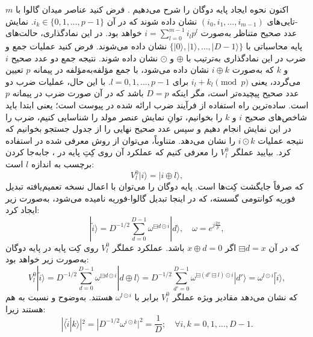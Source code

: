 اکنون نحوه ایجاد پایه دوگان را شرح می‌دهیم \cite{8-78, 8-84}. فرض کنید عناصر میدان گالوا با $m$-تایی‌های $(i_0, i_1, \dots, i_{m-1})$ نشان داده شوند که در آن $i_k \in \{0, 1, \dots, p-1\}$. نمایش عدد صحیح متناظر به‌صورت $i = \sum_{l=0}^{m-1} i_l p^l$ خواهد بود. در این نمادگذاری، حالت‌های پایه محاسباتی با $\{|0\rangle, |1\rangle, \dots, |D-1\rangle\}$ نشان داده می‌شوند. فرض کنید عملیات جمع و ضرب در این نمادگذاری به‌ترتیب با $\oplus$ و $\odot$ نشان داده شوند. نتیجه جمع دو عدد صحیح $i$ و $k$ که به‌صورت $i \oplus k$ نشان داده می‌شود، با جمع مؤلفه‌به‌مؤلفه در پیمانه $p$ تعیین می‌گردد، یعنی $i_l + k_l \pmod p$ برای $l = 0, 1, \dots, p-1$. با این حال، عملیات ضرب دو عدد صحیح پیچیده‌تر است، مگر اینکه $D = p$ باشد که در آن صورت ضرب در پیمانه $p$ است. ساده‌ترین راه استفاده از فرآیند ضرب ارائه شده در پیوست است؛ یعنی ابتدا باید شاخص‌های صحیح $i$ و $k$ را بخوانیم، توانِ نمایش عنصر مولد را شناسایی کنیم، ضرب را در این نمایش انجام دهیم و سپس عدد صحیح نهایی را از جدول جستجو بخوانیم که نتیجه عملیات $i \odot k$ را نشان می‌دهد. متناوباً، می‌توان از روش معرفی شده در \cite{8-78} استفاده کرد. بیایید عملگر $V_l^0$ را معرفی کنیم که عملکرد آن روی کِتِ پایه در ، جابه‌جا کردن برچسب به اندازه $l$ است:
\begin{equation}
	V_l^0 |i\rangle = |i \oplus l\rangle,
	\label{eq:8-82}
\end{equation}
که صرفاً جایگشت کِت‌ها است. پایه دوگان را می‌توان با اعمال نسخه تعمیم‌یافته تبدیل فوریه کوانتومی گسسته، که در اینجا تبدیل گالوا-فوریه نامیده می‌شود، به‌صورت زیر ایجاد کرد:
\begin{equation}
	|\tilde{i}\rangle = D^{-1/2} \sum_{d=0}^{D-1} \omega^{\boxminus d \odot i} |d\rangle, \quad \omega = e^{j\frac{2\pi}{p}},
	\label{eq:8-83}
\end{equation}
که در آن $\boxminus d = x$ اگر $x \oplus d = 0$ باشد. عملکرد عملگر $V_l^0$ روی کِت پایه در پایه دوگان به‌صورت زیر خواهد بود:
\begin{equation}
	V_l^0 |\tilde{i}\rangle = D^{-1/2} \sum_{d=0}^{D-1} \omega^{\boxminus d \odot i} |d \oplus l\rangle = D^{-1/2} \sum_{d'=0}^{D-1} \omega^{\boxminus(d' \boxminus l) \odot i} |d'\rangle = \omega^{l \odot i} |\tilde{i}\rangle,
	\label{eq:8-84}
\end{equation}
که نشان می‌دهد مقادیر ویژه عملگر $V_l^0$ برابر با $\omega^{l \odot i}$ هستند. به‌وضوح  و  نسبت به هم  هستند زیرا:
\begin{equation}
	|\langle \tilde{i} | k \rangle|^2 = |D^{-1/2} \omega^{i \odot k}|^2 = \frac{1}{D}; \quad \forall i, k = 0, 1, \dots, D-1.
	\label{eq:8-85}
\end{equation}

